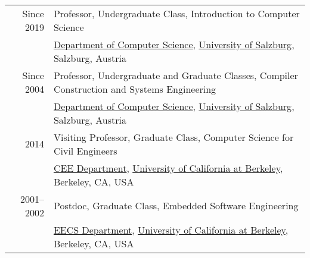 \documentclass[10pt]{article}
\begin{document}
~\\[1ex]
\begin{tabular}{rl}
Since 2019 & Professor, Undergraduate Class, Introduction to Computer Science \\
                & \href{https://informatik.uni-salzburg.at}{Department of Computer Science}, \href{https://plus.ac.at}{University of Salzburg}, Salzburg, Austria \\
Since 2004 & Professor, Undergraduate and Graduate Classes, Compiler Construction and Systems Engineering \\
                & \href{https://informatik.uni-salzburg.at}{Department of Computer Science}, \href{https://plus.ac.at}{University of Salzburg}, Salzburg, Austria \\
\noalign{\smallskip}
2014 & Visiting Professor, Graduate Class, Computer Science for Civil Engineers \\
                & \href{http://www.ce.berkeley.edu}{CEE Department}, \href{http://www.berkeley.edu}{University of California at Berkeley}, Berkeley, CA, USA \\
\noalign{\smallskip}
2001--2002 & Postdoc, Graduate Class, Embedded Software Engineering \\
                & \href{http://www.eecs.berkeley.edu}{EECS Department}, \href{http://www.berkeley.edu}{University of California at Berkeley}, Berkeley, CA, USA \\
\end{tabular}
\end{document}

